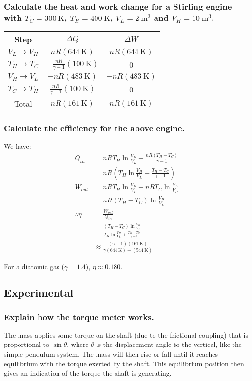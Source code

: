\documentclass[a4paper]{scrartcl}
\begin{document}
\subsubsection{Calculate the heat and work change for a Stirling engine with \(T_C = \SI{300}{\kelvin}\), \(T_H = \SI{400}{\kelvin}\), \(V_L = \SI{2}{\metre\cubed}\) and \(V_H = \SI{10}{\metre\cubed}\).}
\begin{center}
\begin{tabular}{c | c | c}
    Step & \(\Delta Q\) & \(\Delta W\) \\
    \hline
    \(V_L \to V_H\) & \(n R (\SI{644}{\kelvin})\) & \(n R (\SI{644}{\kelvin})\) \\
    \(T_H \to T_C\) & \(-\frac{n R}{\gamma - 1} (\SI{100}{\kelvin})\) & 0 \\
    \(V_H \to V_L\) & \(-n R (\SI{483}{\kelvin})\) & \(-n R (\SI{483}{\kelvin})\) \\
    \(T_C \to T_H\) & \(\frac{n R}{\gamma - 1} (\SI{100}{\kelvin})\) & 0 \\
    \hline
    Total & \(n R (\SI{161}{\kelvin})\) & \(n R (\SI{161}{\kelvin})\)
\end{tabular}
\end{center}

\subsubsection{Calculate the efficiency for the above engine.}
We have:
\begin{align*}
    Q_{in} &= n R T_H \ln \frac{V_H}{V_L} + \frac{n R (T_H - T_C)}{\gamma - 1} \\
    &= n R \left(T_H \ln \frac{V_H}{V_L} + \frac{T_H - T_C}{\gamma - 1}\right) \\
    W_{out} &= n R T_H \ln \frac{V_H}{V_L} + n R T_C \ln \frac{V_L}{V_H} \\
    &= n R (T_H - T_C) \ln \frac{V_H}{V_L} \\
    \therefore \eta &= \frac{W_{out}}{Q_{in}} \\
    &= \frac{(T_H - T_C) \ln \frac{V_H}{V_L}}{T_H \ln \frac{V_H}{V_L} + \frac{T_H - T_C}{\gamma - 1}} \\
    &\approx \frac{(\gamma - 1) (\SI{161}{\kelvin})}{\gamma  (\SI{644}{\kelvin}) - (\SI{544}{\kelvin})}
\end{align*}

For a diatomic gas (\(\gamma = 1.4\)), \(\eta \approx 0.180\).

\subsection{Experimental}
\subsubsection{Explain how the torque meter works.}
The mass applies some torque on the shaft (due to the frictional coupling) that is proportional to \(\sin \theta\), where \(\theta\) is the displacement angle to the vertical, like the simple pendulum system. The mass will then rise or fall until it reaches equilibrium with the torque exerted by the shaft. This equilibrium position then gives an indication of the torque the shaft is generating.
\end{document}

